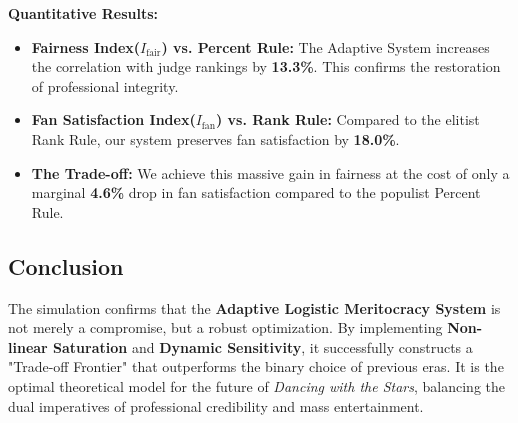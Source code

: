 \textbf{Quantitative Results:}
\begin{itemize}
\item \textbf{Fairness Index($I_{\text{fair}}$) vs. Percent Rule:} The Adaptive System increases the correlation with judge rankings by \textbf{13.3\%}. This confirms the restoration of professional integrity.
\item \textbf{Fan Satisfaction Index($I_{\text{fan}}$) vs. Rank Rule:} Compared to the elitist Rank Rule, our system preserves fan satisfaction by \textbf{18.0\%}.
\item \textbf{The Trade-off:} We achieve this massive gain in fairness at the cost of only a marginal \textbf{4.6\%} drop in fan satisfaction compared to the populist Percent Rule.
\end{itemize}

\subsection{Conclusion}
The simulation confirms that the \textbf{Adaptive Logistic Meritocracy System} is not merely a compromise, but a robust optimization. By implementing \textbf{Non-linear Saturation} and \textbf{Dynamic Sensitivity}, it successfully constructs a "Trade-off Frontier" that outperforms the binary choice of previous eras. It is the optimal theoretical model for the future of \textit{Dancing with the Stars}, balancing the dual imperatives of professional credibility and mass entertainment.
